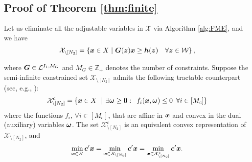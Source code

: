 \documentclass[fleqn,mnsc,blindrev]{informs4}
\newcommand{\mb}[1]{\mbox{\boldmath \ensuremath{#1}}}
\begin{document}
\begin{appendices}
	
	
 { \iffalse
	
\section{Proof of Theorem \ref{thm:finite} \label{proof:finitewcs} }
Let us eliminate all the adjustable variables in $\mathcal{X}$ via Algorithm \ref{alg:FME}, and we have 
\begin{equation*}
\mathcal{X}_{\setminus [N_2]} =  \left\{ \mb{x} \in X \hspace{3pt} | \hspace{3pt} \mb{G}(\mb{z}) \mb{x}  \geq\mb{h}(\mb{z})  \quad  \forall \mb{z} \in \mathcal{W} \right\},
\end{equation*}

	where $\mb{G}\in \mathcal{L}^{I_1,M_G}$ and $M_G \in \mathbb{Z}_+$ denotes the number of constraints. Suppose the semi-infinite constrained set $\mathcal{X}_{\setminus [N_2]}$ admits the following tractable counterpart (see, e.g., \cite{bdv15,gbbd14}):
\begin{equation*}
	\mathcal{X}^{c}_{\setminus [N_2]} =\left\{ \mb{x} \in X \enskip | \enskip \exists \mb{\omega} \ge \mb{0}: \enskip f_i(\mb{x}, \mb{\omega}) \le 0 \enskip \forall i\in [M_c] \right\}
\end{equation*}
	where the functions $f_i$, $\forall i\in [M_c]$, that are affine in $\mb{x}$ and convex in the dual (auxiliary) variables $\mb{\omega}$. The set $\mathcal{X}^{c}_{\setminus [N_2]}$ is an equivalent convex representation of $\mathcal{X}_{\setminus [N_2]}$, and
\begin{equation} \label{eq:convexref}
	\min_{\boldsymbol{x} \in \mathcal{X}} \mb{c}'\mb{x} =\min_{\boldsymbol{x} \in \mathcal{X}_{\setminus [N_2]}} \mb{c}'\mb{x} = \min_{\boldsymbol{x} \in \mathcal{X}^{c}_{\setminus [N_2]}} \mb{c}'\mb{x}.
\end{equation}
   
}
\end{appendices}
\end{document}
